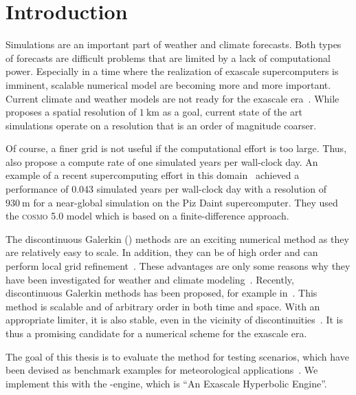 \chapter{Introduction}\label{chap:introduction}
Simulations are an important part of weather and climate forecasts.
Both types of forecasts are difficult problems that are limited by a lack of computational power.
Especially in a time where the realization of exascale supercomputers is imminent, scalable numerical model are becoming more and more important.
Current climate and weather models are not ready for the exascale era~\cite{schulthess2018reflecting}.
While~\cite{schulthess2018reflecting} proposes a spatial resolution of $\SI{1}{\kilo\meter}$ as a goal, current state of the art simulations operate on a resolution that is an order of magnitude coarser.

Of course, a finer grid is not useful if the computational effort is too large.
Thus, also propose a compute rate of one simulated years per wall-clock day.
An example of a recent supercomputing effort in this domain~\cite{fuhrer2018near} achieved a performance of 0.043 simulated years per wall-clock day with a resolution of $\SI{930}{\m}$ for a near-global simulation on the Piz Daint supercomputer.
They used the \textsc{cosmo} 5.0 model which is based on a finite-difference approach.

The discontinuous Galerkin (\dg{}) methods are an exciting numerical method as they are relatively easy to scale.
In addition, they can be of high order and can perform local grid refinement~\cite{hesthaven2008nodal}.
These advantages are only some reasons why they have been investigated for weather and climate modeling~\cite{muller2010adaptive,giraldo2008study}.
Recently, \ader{} discontinuous Galerkin methods has been proposed, for example in~\cite{dumbser2008unified}.
This method is scalable and of arbitrary order in both time and space.
With an appropriate limiter, it is also stable, even in the vicinity of discontinuities~\cite{dumbser2016simple}.
It is thus a promising candidate for a numerical scheme for the exascale era.

The goal of this thesis is to evaluate the \aderdg{} method for testing scenarios, which have been devised as benchmark examples for meteorological applications~\cite{robert1993bubble,giraldo2008study}.
We implement this with the \exahype{}-engine, which is \enquote{An Exascale Hyperbolic \pde{} Engine}.

